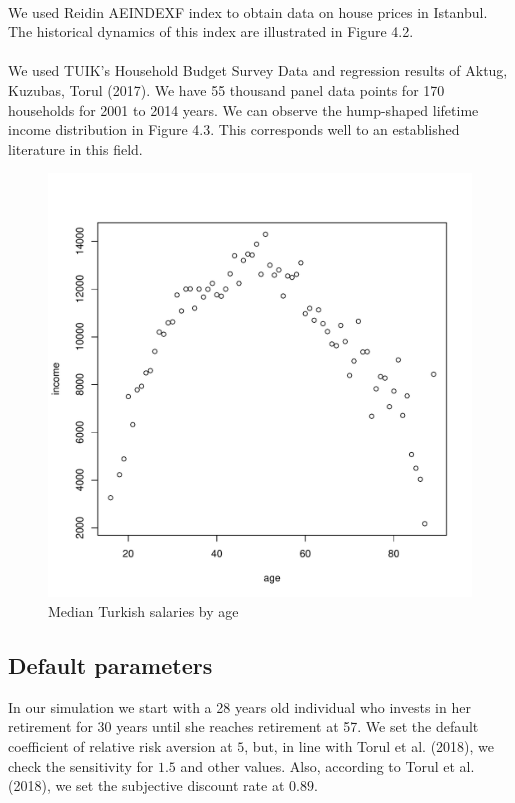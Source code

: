 \paragraph{}We used Reidin AEINDEXF index to obtain data on house prices in Istanbul. The historical dynamics of this index are illustrated in Figure 4.2.

\paragraph{}We used TUIK's Household Budget Survey Data and regression results of Aktug, Kuzubas, Torul (2017). We have 55 thousand panel data points for 170 households for 2001 to 2014 years. We can observe the hump-shaped lifetime income distribution in Figure 4.3. This corresponds well to an established literature in this field.

\begin{figure}[h]
	\centering
	\includegraphics[scale=0.6]{figs/wage2median.pdf}
	\caption{Median Turkish salaries by age}
\end{figure}

\subsection{Default parameters}
In our simulation we start with a 28 years old individual who invests in her retirement for 30 years until she reaches retirement at 57. We set the default coefficient of relative risk aversion at $5$, but, in line with Torul et al. (2018), we check the sensitivity for $1.5$ and other values. Also, according to Torul et al. (2018), we set the subjective discount rate at $0.89$.

